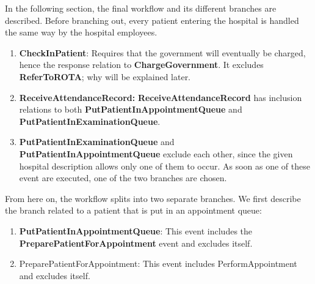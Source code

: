 In the following section, the final workflow and its different branches are described. Before branching out, every patient entering the hospital is handled the same way by the hospital employees.

\begin{enumerate}
\item \textbf{CheckInPatient}: Requires that the government will eventually be charged, hence the response relation to \textbf{ChargeGovernment}. It excludes \textbf{ReferToROTA}; why will be explained later. 
\item \textbf{ReceiveAttendanceRecord:} \textbf{ReceiveAttendanceRecord} has inclusion relations to both \textbf{PutPatientInAppointmentQueue} and \textbf{PutPatientInExaminationQueue}. 
\item \textbf{PutPatientInExaminationQueue} and \textbf{PutPatientInAppointmentQueue} exclude each other, since the given hospital description allows only one of them to occur. \newline
As soon as one of these event are executed, one of the two branches are chosen.
\end{enumerate}

From here on, the workflow splits into two separate branches. We first describe the branch related to a patient that is put in an appointment queue: 
\begin{enumerate}
\item \textbf{PutPatientInAppointmentQueue}: This event includes the \textbf{PreparePatientForAppointment} event and excludes itself.
\item PreparePatientForAppointment: This event includes PerformAppointment and excludes itself.
\end{enumerate}